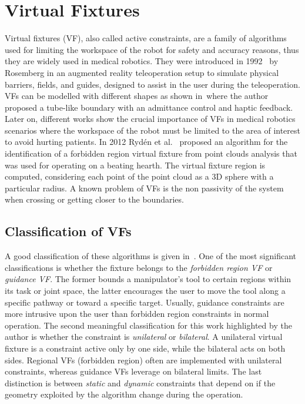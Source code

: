 \newpage
\chapter{Virtual Fixtures}

Virtual fixtures (VF), also called active constraints, are a family of algorithms used for limiting the workspace of the robot for safety and accuracy reasons, thus they are widely used in medical robotics. They were introduced in 1992~\cite{rosemberg1992use} by Rosemberg in an augmented reality teleoperation setup to simulate physical barriers, fields, and guides, designed to assist in the user during the teleoperation. 
VFs can be modelled with different shapes as shown in~\cite{bettini2004vision}where the author proposed a tube-like boundary with an admittance control and haptic feedback. Later on, different works show the crucial importance of VFs in medical robotics scenarios where the workspace of the robot must be limited to the area of interest to avoid hurting patients. In 2012 Rydén et al.~\cite{ryden2012forbidden} proposed an algorithm for the identification of a forbidden region virtual fixture from point clouds analysis that was used for operating on a beating hearth. The virtual fixture region is computed, considering each point of the point cloud as a 3D sphere with a particular radius. A known problem of VFs is the non passivity of the system when crossing or getting closer to the boundaries. 

\section{Classification of VFs}

A good classification of these algorithms is given in~\cite{bowyer2014active}. One of the most significant classifications is whether the fixture belongs to the \textit{forbidden region VF} or \textit{guidance VF}. The former bounds a manipulator’s tool to certain regions within its task or joint space, the latter encourages the user to move the tool along a specific pathway or toward a specific target. Usually, guidance constraints are more intrusive upon the user than forbidden region constraints in normal operation. The second meaningful classification for this work highlighted by the author is whether the constraint is \textit{unilateral} or \textit{bilateral}.
A unilateral virtual fixture is a constraint active only by one side, while the bilateral acts on both sides. 
Regional VFs (forbidden region) often are implemented with unilateral constraints, whereas guidance VFs leverage on bilateral limits.
The last distinction is between \textit{static} and \textit{dynamic} constraints that depend on if the geometry exploited by the algorithm change during the operation.

